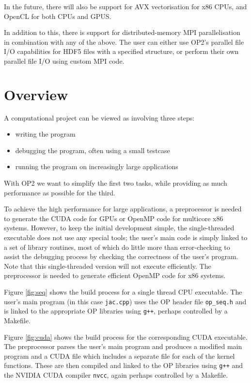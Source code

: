 \documentclass[11pt]{article}
\begin{document}
In the future, there will also be support for AVX vectorisation
for x86 CPUs, and OpenCL for both CPUs and GPUS.

In addition to this, there is support for distributed-memory MPI
parallelisation in combination with any of the above.  The user
can either use OP2's parallel file I/O capabilities for HDF5
files with a specified structure, or perform their own parallel
file I/O using custom MPI code.

\newpage
\section{Overview}

A computational project can be viewed as involving three steps:
\begin{itemize}
\item
writing the program
\item
debugging the program, often using a small testcase
\item
running the program on increasingly large applications
\end{itemize}

With OP2 we want to simplify the first two tasks, while
providing as much performance as possible for the third.

To achieve the high performance for large applications, a
preprocessor is needed to generate the CUDA code for GPUs
or OpenMP code for multicore x86 systems.  However, to keep
the initial development simple, the single-threaded executable
does not use any special tools; the user's main code is simply
linked to a set of library routines, most of which do little
more than error-checking to assist the debugging process by
checking the correctness of the user's program.  Note that this
single-threaded version will not execute efficiently.  The
preprocessor is needed to generate efficient OpenMP code for
x86 systems.

Figure \ref{fig:seq} shows the build process for a single
thread CPU executable.  The user's main program (in this case
{\tt jac.cpp}) uses the OP header file {\tt op\_seq.h} and is
linked to the appropriate OP libraries using {\tt g++},
perhaps controlled by a Makefile.

Figure \ref{fig:cuda} shows the build process for the corresponding
CUDA executable.  The preprocessor parses the user's main program
and produces a modified main program and a CUDA file which
includes a separate file for each of the kernel functions.  These
are then compiled and linked to the OP libraries
using {\tt g++} and the NVIDIA CUDA compiler {\tt nvcc}, again
perhaps controlled by a Makefile.
\end{document}

